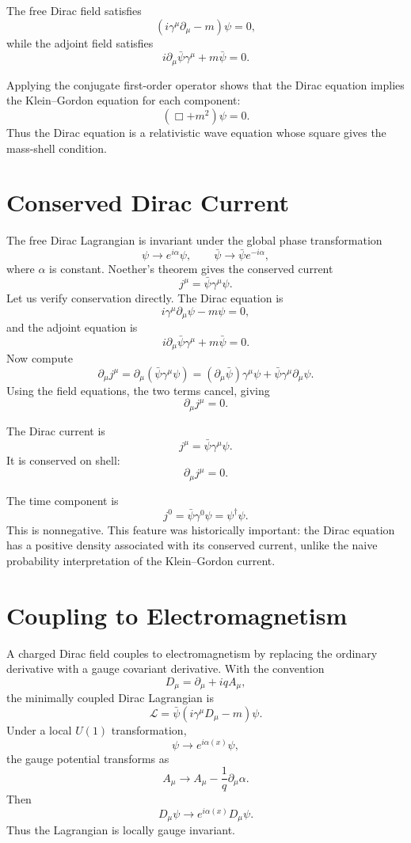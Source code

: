 \begin{theorembox}
The free Dirac field satisfies
\[
    (i\gamma^\mu\partial_\mu-m)\psi=0,
\]
while the adjoint field satisfies
\[
    i\partial_\mu\bar\psi\gamma^\mu+m\bar\psi=0.
\]
\end{theorembox}

Applying the conjugate first-order operator shows that the Dirac equation implies
the Klein--Gordon equation for each component:
\[
    (\Box+m^2)\psi=0.
\]
Thus the Dirac equation is a relativistic wave equation whose square gives the
mass-shell condition.

\section{Conserved Dirac Current}

The free Dirac Lagrangian is invariant under the global phase transformation
\[
    \psi\longrightarrow e^{i\alpha}\psi,
    \qquad
    \bar\psi\longrightarrow \bar\psi e^{-i\alpha},
\]
where \(\alpha\) is constant. Noether's theorem gives the conserved current
\[
    j^\mu=\bar\psi\gamma^\mu\psi.
\]
Let us verify conservation directly. The Dirac equation is
\[
    i\gamma^\mu\partial_\mu\psi-m\psi=0,
\]
and the adjoint equation is
\[
    i\partial_\mu\bar\psi\gamma^\mu+m\bar\psi=0.
\]
Now compute
\[
    \partial_\mu j^\mu
    =\partial_\mu(\bar\psi\gamma^\mu\psi)
    =(\partial_\mu\bar\psi)\gamma^\mu\psi
     +\bar\psi\gamma^\mu\partial_\mu\psi.
\]
Using the field equations, the two terms cancel, giving
\[
    \partial_\mu j^\mu=0.
\]

\begin{definitionbox}
The Dirac current is
\[
    j^\mu=\bar\psi\gamma^\mu\psi.
\]
It is conserved on shell:
\[
    \partial_\mu j^\mu=0.
\]
\end{definitionbox}

The time component is
\[
    j^0=\bar\psi\gamma^0\psi=\psi^\dagger\psi.
\]
This is nonnegative. This feature was historically important: the Dirac equation
has a positive density associated with its conserved current, unlike the naive
probability interpretation of the Klein--Gordon current.

\section{Coupling to Electromagnetism}

A charged Dirac field couples to electromagnetism by replacing the ordinary
derivative with a gauge covariant derivative. With the convention
\[
    D_\mu=\partial_\mu+iqA_\mu,
\]
the minimally coupled Dirac Lagrangian is
\[
    \mathcal{L}
    =\bar\psi(i\gamma^\mu D_\mu-m)\psi.
\]
Under a local \(U(1)\) transformation,
\[
    \psi\longrightarrow e^{i\alpha(x)}\psi,
\]
the gauge potential transforms as
\[
    A_\mu\longrightarrow A_\mu-\frac{1}{q}\partial_\mu\alpha.
\]
Then
\[
    D_\mu\psi\longrightarrow e^{i\alpha(x)}D_\mu\psi.
\]
Thus the Lagrangian is locally gauge invariant.

